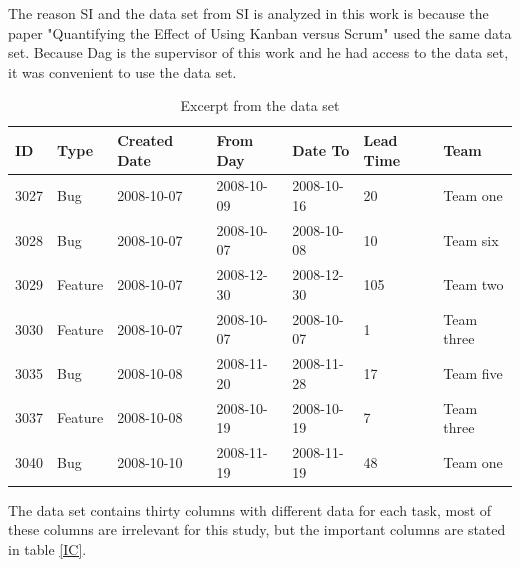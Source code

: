\documentclass[UKenglish]{ifimaster}  %
\begin{document}
The reason SI and the data set from SI is analyzed in this work is because the paper "Quantifying the Effect of Using Kanban versus Scrum" \parencite{Dag} used the same data set. Because Dag is the supervisor of this work and he had access to the data set, it was convenient to use the data set.

\begin{table}[!ht]
\begin{center}
\begin{tabular}{|l|l|l|l|l|l|l|}
\hline
ID	& Type &  Created Date & From Day & Date To & Lead Time & Team \\ \hline
    3027 & Bug & 2008-10-07 &  2008-10-09 & 2008-10-16 & 20 & Team one\\ \hline
   3028 & Bug  & 2008-10-07 & 2008-10-07 & 2008-10-08 & 10 & Team six\\ \hline
   3029 & Feature & 2008-10-07 &  2008-12-30	 & 2008-12-30 & 105 & Team two\\ \hline
    3030 & Feature & 2008-10-07 & 2008-10-07	& 2008-10-07 & 1& Team three\\ \hline
   3035 & Bug & 2008-10-08 & 2008-11-20 & 2008-11-28 & 17 & Team five\\ \hline
   3037 & Feature & 2008-10-08 &  2008-10-19	 & 2008-10-19 & 7 & Team three\\ \hline
   3040 & Bug & 2008-10-10 &  2008-11-19 & 2008-11-19 & 48 & Team one\\ \hline
   \end{tabular}
\caption{Excerpt from the data set}
\label{dataset}
\end{center}
\end{table}

The data set contains thirty columns with different data for each task, most of these columns are irrelevant for this study, but the important columns are stated in table \ref{IC}.
\end{document}
